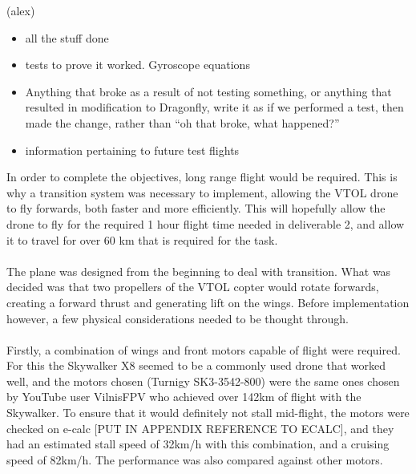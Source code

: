 \color{red}
(alex)
\begin{itemize}
\item all the stuff done
\item tests to prove it worked. Gyroscope equations
\item Anything that broke as a result of not testing something, or anything that resulted in modification to Dragonfly, write it as if we performed a test, then made the change, rather than ``oh that broke, what happened?''
\item information pertaining to future test flights
\end{itemize}
\color{black}
In order to complete the objectives, long range flight would be required. This is why a transition system was necessary to implement, allowing the VTOL drone to fly forwards, both faster and more efficiently. This will hopefully allow the drone to fly for the required 1 hour flight time needed in deliverable 2, and allow it to travel for over 60 km that is required for the task. 
\\\\
The plane was designed from the beginning to deal with transition. What was decided was that two propellers of the VTOL copter would rotate forwards, creating a forward thrust and generating lift on the wings.  Before implementation however, a few physical considerations needed to be thought through.
\\\\
Firstly, a combination of wings and front motors capable of flight were required.  For this the Skywalker X8 seemed to be a commonly used drone that worked well, and the motors chosen (Turnigy SK3-3542-800) were the same ones chosen by YouTube user VilnisFPV who achieved over 142km of flight with the Skywalker. To ensure that it would definitely not stall mid-flight, the motors were checked on e-calc \color{red}[PUT IN APPENDIX REFERENCE TO ECALC]\color{black}, and they had an estimated stall speed of 32km/h with this combination, and a cruising speed of 82km/h.  The performance was also compared against other motors. 
\\\\
